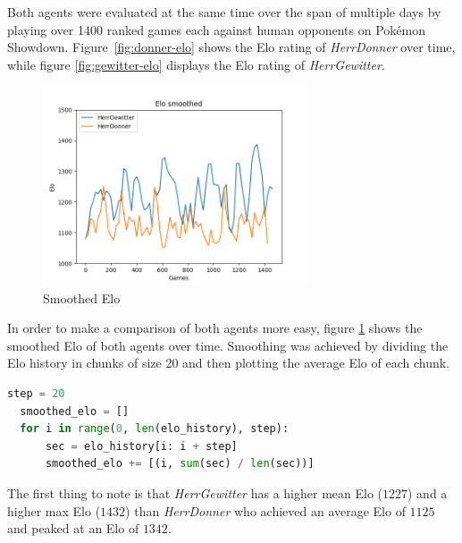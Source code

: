 Both agents were evaluated at the same time over the span of multiple days by playing over 1400 ranked games each 
against human opponents on Pokémon Showdown. Figure~\ref{fig:donner-elo} shows the Elo rating of \textit{HerrDonner}
over time, while figure \ref{fig:gewitter-elo} displays the Elo rating of \textit{HerrGewitter}. 
\begin{figure}[h]
	\centering
	\includegraphics[width=0.7\textwidth]{images/Smoothed-Elo-Time.png}
	\caption{Smoothed Elo}
	\label{fig:elo-smoothed}
\end{figure}
In order to make a comparison of both agents more easy, figure \ref{fig:elo-smoothed} shows the smoothed Elo of
both agents over time. Smoothing was achieved by dividing the Elo history in chunks of size 20 and then plotting
the average Elo of each chunk. 
\\\begin{minipage}{\linewidth}
\begin{lstlisting}[language=Python, caption=Smoothing Elo values]
  step = 20
  smoothed_elo = []
  for i in range(0, len(elo_history), step):
      sec = elo_history[i: i + step]
      smoothed_elo += [(i, sum(sec) / len(sec))]
\end{lstlisting}
\end{minipage}
The first thing to note is that \textit{HerrGewitter} has a higher mean Elo ($1227$) and a higher max Elo ($1432$)
than \textit{HerrDonner} who achieved an average Elo of $1125$ and peaked at an Elo of $1342$. 
